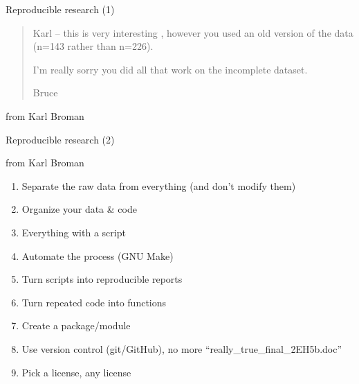 \documentclass[9pt,ignorenonframetext,]{beamer}
\providecommand{\tightlist}{%
  \setlength{\itemsep}{0pt}\setlength{\parskip}{0pt}}
\begin{document}
\begin{frame}{Reproducible research (1)}

\begin{quote}
Karl -- this is very interesting , however you used an old version of
the data (n=143 rather than n=226).

I'm really sorry you did all that work on the incomplete dataset.

Bruce
\end{quote}

from Karl Broman

\end{frame}

\begin{frame}{Reproducible research (2)}

from Karl Broman

\begin{enumerate}
\def\labelenumi{\arabic{enumi}.}
\setcounter{enumi}{-1}
\tightlist
\item
  Separate the raw data from everything (and don't modify them)
\item
  Organize your data \& code
\item
  Everything with a script
\item
  Automate the process (GNU Make)
\item
  Turn scripts into reproducible reports
\item
  Turn repeated code into functions
\item
  Create a package/module
\item
  Use version control (git/GitHub), no more
  ``really\_true\_final\_2EH5b.doc''
\item
  Pick a license, any license
\end{enumerate}

\end{frame}
\end{document}
